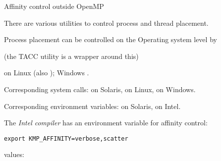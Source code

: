 \begin{comment}
[c202-002 c:1] export OMP_PLACES=cores
[c202-002 c:2] export OMP_PROC_BIND=close
[c202-002 c:3] make heat && OMP_NUM_THREADS=56 ./heat
make: `heat' is up to date.
Time=  2.0048 #ops=2.000e+09 on 56 threads
[c202-002 c:4] make heat && OMP_NUM_THREADS=56 ./heat
make: `heat' is up to date.
Time=  2.2479 #ops=2.000e+09 on 56 threads
[c202-002 c:5] make heat && OMP_NUM_THREADS=56 ./heat
make: `heat' is up to date.
Time=  1.9717 #ops=2.000e+09 on 56 threads
[c202-002 c:6] make heat && OMP_NUM_THREADS=56 ./heat
make: `heat' is up to date.
Time=  2.1107 #ops=2.000e+09 on 56 threads
[c202-002 c:7] make heat && OMP_NUM_THREADS=56 ./heat
make: `heat' is up to date.
Time=  2.1087 #ops=2.000e+09 on 56 threads
[c202-002 c:8] make heat && OMP_NUM_THREADS=56 ./heat 1
make: `heat' is up to date.
Parallel init
Time=  1.0420 #ops=2.000e+09 on 56 threads
[c202-002 c:9] make heat && OMP_NUM_THREADS=56 ./heat 1
make: `heat' is up to date.
Parallel init
Time=  0.9962 #ops=2.000e+09 on 56 threads
[c202-002 c:10] make heat && OMP_NUM_THREADS=56 ./heat 1
make: `heat' is up to date.
Parallel init
Time=  1.0077 #ops=2.000e+09 on 56 threads
[c202-002 c:11] make heat && OMP_NUM_THREADS=56 ./heat 1
make: `heat' is up to date.
Parallel init
Time=  0.9939 #ops=2.000e+09 on 56 threads
[c202-002 c:12] make heat && OMP_NUM_THREADS=56 ./heat 1
make: `heat' is up to date.
Parallel init
Time=  0.9880 #ops=2.000e+09 on 56 threads
\end{comment}

 {Affinity control outside OpenMP}

There are various utilities to control process and thread placement.

Process placement can be controlled on the Operating system level by
\begin{tacc}
(the TACC utility  is a wrapper around this)
\end{tacc}
on Linux (also ); Windows
.

Corresponding system calls:  on Solaris,
 on Linux,
 on Windows.

Corresponding environment variables:  on
Solaris,  on Intel.

The \emph{Intel compiler} has an
environment variable for affinity control:
\begin{verbatim}
export KMP_AFFINITY=verbose,scatter
\end{verbatim}
values: 

